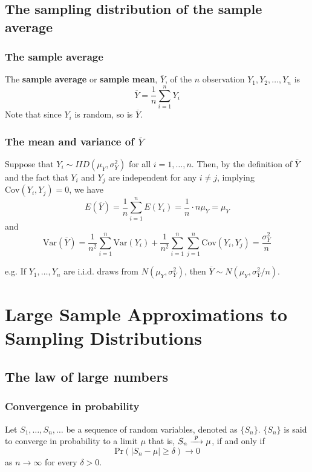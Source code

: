 \documentclass[a4paper,11pt]{article}
\newcommand{\var}{\mathrm{Var}}
\newcommand{\cov}{\mathrm{Cov}}
\begin{document}
\subsection{The sampling distribution of the sample average}
\label{sec:org2276567}
\subsubsection*{The sample average}
\label{sec:org96653ed}
The \textbf{sample average} or \textbf{sample mean}, \(\overline{Y}\), of the \(n\)
observation \(Y_1, Y_2, \ldots, Y_n\) is
\[ \overline{Y} = \frac{1}{n}\sum^n_{i=1} Y_i \]
Note that since \(Y_i\) is random, so is \(\overline{Y}\).

\subsubsection*{The mean and variance of \(\overline{Y}\)}
\label{sec:orga6af3ab}
Suppose that \(Y_i \sim IID(\mu_Y, \sigma^2_{Y})\) for all \(i = 1,
\ldots, n\). Then, by the definition of \(\overline{Y}\) and the fact
that \(Y_i\) and \(Y_j\) are independent for any \(i \neq j\), implying
\(\cov(Y_i, Y_j)=0\), we have
\[
E(\overline{Y}) =
\frac{1}{n}\sum^n_{i=1}E(Y_i) = \frac{1}{n}\cdot n\mu_Y = \mu_Y
\]
and
\[
\var(\overline{Y}) = \frac{1}{n^2}\sum^n_{i=1}\var(Y_i) +
\frac{1}{n^2}\sum^n_{i=1}\sum^n_{j=1}\cov(Y_i, Y_j) =
\frac{\sigma^2_Y}{n}
\]

e.g. If \(Y_1, \ldots, Y_n\) are i.i.d. draws from \(N(\mu_Y,
\sigma^2_Y)\), then \(\overline{Y} \sim N(\mu_Y, \sigma^2_Y/n)\).


\section{Large Sample Approximations to Sampling Distributions}
\label{sec:org3d61c89}
\subsection{The law of large numbers}
\label{sec:org3c9523d}
\subsubsection*{Convergence in probability}
\label{sec:org9a57a15}
Let \(S_1, \ldots, S_n, \ldots\) be a sequence of random variables,
denoted as \(\{S_n\}\). \(\{S_n\}\) is said to converge in probability to a
limit \(\mu\) that is, \(S_n \xrightarrow{\text{ \textit p }} \mu\), if and only if
\[ \mathrm{Pr} \left(|S_n-\mu| \geq \delta \right) \rightarrow 0 \]
as \(n \rightarrow \infty\) for every \(\delta > 0\).
\end{document}
